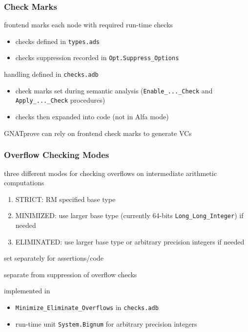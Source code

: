 \documentclass{beamer}
\newcommand{\vs}{\vspace{0.5cm}}
\newenvironment{specialframe}{%
  \begin{frame}[fragile,environment=specialframe]}{\end{frame}}
\begin{document}
\begin{specialframe}
  \frametitle{Check Marks}

frontend marks each node with required run-time checks
\begin{itemize}
\item checks defined in \verb|types.ads|
\item checks suppression recorded in \verb|Opt.Suppress_Options|
\end{itemize}

\vs

handling defined in \verb|checks.adb|
\begin{itemize}
\item check marks set during semantic analysis (\verb|Enable_..._Check| and
  \verb|Apply_..._Check| procedures)
\item checks then expanded into code (not in Alfa mode)
\end{itemize}

\vs

GNATprove can rely on frontend check marks to generate VCs

\end{specialframe}

\begin{specialframe}
  \frametitle{Overflow Checking Modes}

three different modes for checking overflows on intermediate arithmetic
computations
\begin{enumerate}
\item STRICT: RM specified base type
\item MINIMIZED: use larger base type (currently 64-bits
  \verb|Long_Long_Integer|) if needed
\item ELIMINATED: use larger base type or arbitrary precision integers if needed
\end{enumerate}

\vs

set separately for assertions/code

\vs

separate from suppression of overflow checks

\vs

implemented in
\begin{itemize}
\item \verb|Minimize_Eliminate_Overflows| in \verb|checks.adb|
\item run-time unit \verb|System.Bignum| for arbitrary precision integers
\end{itemize}
\end{specialframe}
\end{document}

